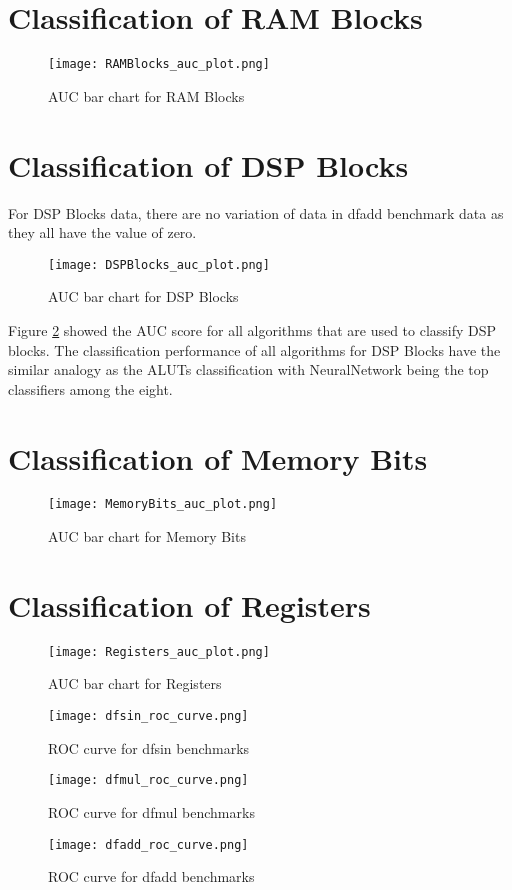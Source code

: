 \section{Classification of RAM Blocks}

\begin{figure}[h!]
\centering
\texttt{[image: RAMBlocks\_auc\_plot.png]}
\caption{AUC bar chart for RAM Blocks}
\label{figure:RAMBlocks_auc_plot}
\end{figure}

\section{Classification of DSP Blocks}

For DSP Blocks data, there are no variation of data in dfadd benchmark data as they all have the value of zero.

\begin{figure}[h!]
\centering
\texttt{[image: DSPBlocks\_auc\_plot.png]}
\caption{AUC bar chart for DSP Blocks}
\label{figure:dsp_auc_plot}
\end{figure}

Figure \ref{figure:dsp_auc_plot} showed the AUC score for all algorithms that are used to classify DSP blocks. The classification performance of all algorithms for DSP Blocks have the similar analogy as the ALUTs classification with NeuralNetwork being the top classifiers among the eight.

\section{Classification of Memory Bits}
\begin{figure}[h!]
\centering
\texttt{[image: MemoryBits\_auc\_plot.png]}
\caption{AUC bar chart for Memory Bits}
\label{figure:MemoryBits_auc_plot}
\end{figure}

\section{Classification of Registers}
\begin{figure}[h!]
\centering
\texttt{[image: Registers\_auc\_plot.png]}
\caption{AUC bar chart for Registers}
\label{figure:Registers_auc_plot}
\end{figure}

\begin{figure}[h!]
\centering
\texttt{[image: dfsin\_roc\_curve.png]}
\caption{ROC curve for dfsin benchmarks}
\label{figure:dfsin_roc_curve}
\end{figure}

\begin{figure}[h!]
\centering
\texttt{[image: dfmul\_roc\_curve.png]}
\caption{ROC curve for dfmul benchmarks}
\label{figure:dfmul_roc_curve}
\end{figure}

\begin{figure}[h!]
\centering
\texttt{[image: dfadd\_roc\_curve.png]}
\caption{ROC curve for dfadd benchmarks}
\label{figure:dfadd_roc_curve}
\end{figure}
